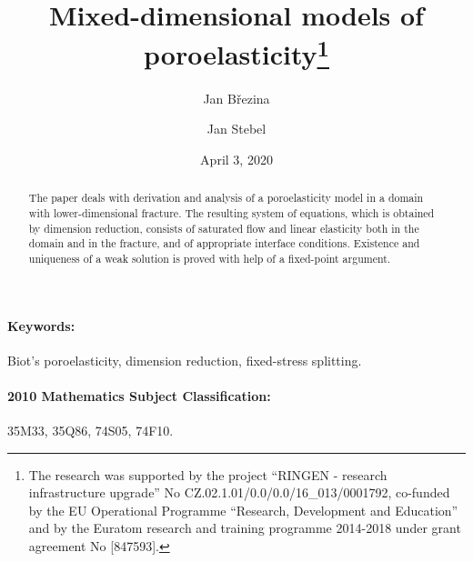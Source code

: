\documentclass[a4paper]{article}
\numberwithin{equation}{section}
\begin{document}
\title{Mixed-dimensional models of poroelasticity\thanks{The research was supported by the project ``RINGEN - research infrastructure upgrade'' No CZ.02.1.01/0.0/0.0/16\_013/0001792, co-funded by the EU Operational Programme ``Research, Development and Education'' and by the Euratom research and training programme 2014-2018 under grant agreement No [847593].}}
\author{Jan Březina}
\author{Jan Stebel}
\date{April 3, 2020}
\maketitle

\begin{abstract}
The paper deals with derivation and analysis of a poroelasticity model in a domain with lower-dimensional fracture.
The resulting system of equations, which is obtained by dimension reduction, consists of saturated flow and linear elasticity both in the domain and in the fracture, and of appropriate interface conditions.
Existence and uniqueness of a weak solution is proved with help of a fixed-point argument.
\end{abstract}

\paragraph{Keywords:}
Biot's poroelasticity, dimension reduction, fixed-stress splitting.

\paragraph{2010 Mathematics Subject Classification:}
35M33, %
35Q86, %
74S05, %
74F10. %
\end{document}
